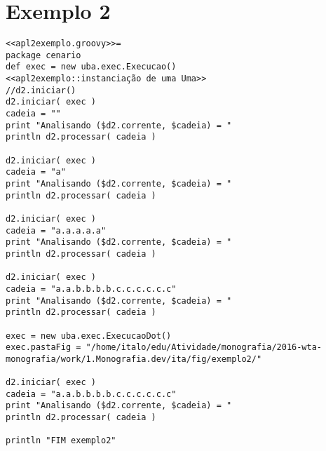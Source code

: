 
\section{Exemplo 2}


\begin{lstlisting}
<<apl2exemplo.groovy>>=
package cenario
def exec = new uba.exec.Execucao()
<<apl2exemplo::instanciação de uma Uma>>
//d2.iniciar()
d2.iniciar( exec )
cadeia = ""
print "Analisando ($d2.corrente, $cadeia) = "
println d2.processar( cadeia )

d2.iniciar( exec )
cadeia = "a"
print "Analisando ($d2.corrente, $cadeia) = "
println d2.processar( cadeia )

d2.iniciar( exec )
cadeia = "a.a.a.a.a"
print "Analisando ($d2.corrente, $cadeia) = "
println d2.processar( cadeia )

d2.iniciar( exec )
cadeia = "a.a.b.b.b.b.c.c.c.c.c.c"
print "Analisando ($d2.corrente, $cadeia) = "
println d2.processar( cadeia )

exec = new uba.exec.ExecucaoDot()
exec.pastaFig = "/home/italo/edu/Atividade/monografia/2016-wta-monografia/work/1.Monografia.dev/ita/fig/exemplo2/"

d2.iniciar( exec )
cadeia = "a.a.b.b.b.b.c.c.c.c.c.c"
print "Analisando ($d2.corrente, $cadeia) = "
println d2.processar( cadeia )

println "FIM exemplo2"
\end{lstlisting}
